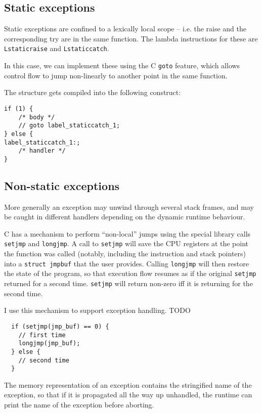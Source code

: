 \documentclass[12pt,a4paper,twoside,openright]{report}
\begin{document}
\subsection{Static exceptions}

Static exceptions are confined to a lexically local scope -- i.e. the raise and the corresponding try are in the same function. The lambda instructions for these are \lstinline!Lstaticraise! and \lstinline!Lstaticcatch!.

In this case, we can implement these using the C \lstinline!goto! feature, which allows control flow to jump non-linearly to another point in the same function.

The structure gets compiled into the following construct:

\begin{lstlisting}
if (1) {
    /* body */
    // goto label_staticcatch_1;
} else {
label_staticcatch_1:;
    /* handler */
}
\end{lstlisting}

\subsection{Non-static exceptions}

More generally an exception may unwind through several stack frames, and may be caught in different handlers depending on the dynamic runtime behaviour.

C has a mechanism to perform ``non-local'' jumps using the special library calls \lstinline!setjmp! and \lstinline!longjmp!. A call to \lstinline!setjmp! will save the CPU registers at the point the function was called (notably, including the instruction and stack pointers) into a \lstinline!struct jmpbuf! that the user provides. Calling \lstinline!longjmp! will then restore the state of the program, so that execution flow resumes as if the original \lstinline!setjmp! returned for a second time. \lstinline!setjmp! will return non-zero iff it is returning for the second time.

I use this mechanism to support exception handling. TODO

\begin{lstlisting}
  if (setjmp(jmp_buf) == 0) {
    // first time
    longjmp(jmp_buf);
  } else {
    // second time
  }
\end{lstlisting}

The memory representation of an exception contains the stringified name of the exception, so that if it is propagated all the way up unhandled, the runtime can print the name of the exception before aborting.
\end{document}
